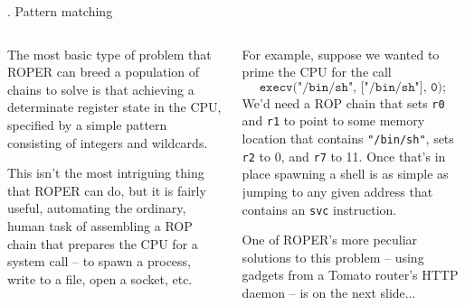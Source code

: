 \documentclass[9pt]{beamer}
\begin{document}
\begin{frame}{\theframenumber. Pattern matching}
  \begin{columns}
    \begin{column}{.5\textwidth}
      The most basic type of problem that ROPER can breed a population of chains to solve is that achieving a determinate register state in the CPU, specified by a simple pattern consisting of integers and wildcards.
      \vspace{8pt}

      This isn't the most intriguing thing that ROPER can do, but it is fairly useful, automating the ordinary, human task of assembling a ROP chain that prepares the CPU for a system call -- to spawn a process, write to a file, open a socket, etc.
    \end{column}
    \begin{column}{.5\textwidth}
      For example, suppose we wanted to prime the CPU for the call
      $$\texttt{execv("/bin/sh", ["/bin/sh"], 0);}$$
      We'd need a ROP chain that sets \texttt{r0} and \texttt{r1} to point to some memory location that contains \texttt{"/bin/sh"}, sets \texttt{r2} to 0, and \texttt{r7} to 11. Once that's in place spawning a shell is as simple as jumping to any given address that contains an \texttt{svc} instruction.
      \vspace{8pt}

      One of ROPER's more peculiar solutions to this problem -- using gadgets from a Tomato router's HTTP daemon -- is on the next slide...
    \end{column}
  \end{columns}
\end{frame}
\end{document}
